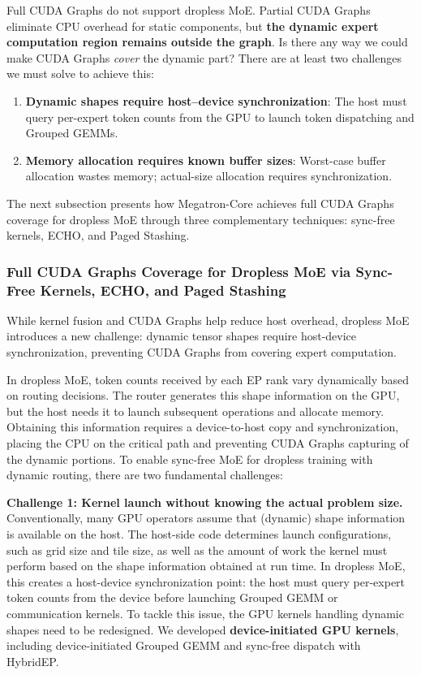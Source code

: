 \documentclass[10pt,logo,copyright]{nvidiatechreport}
\begin{document}
Full CUDA Graphs do not support dropless MoE. Partial CUDA Graphs eliminate CPU overhead for static components, but \textbf{the dynamic expert computation region remains outside the graph}. Is there any way we could make CUDA Graphs \textit{cover} the dynamic part? There are at least two challenges we must solve to achieve this:
\begin{enumerate}
    \item \textbf{Dynamic shapes require host--device synchronization}: The host must query per-expert token counts from the GPU to launch token dispatching and Grouped GEMMs.
    \item \textbf{Memory allocation requires known buffer sizes}: Worst-case buffer allocation wastes memory; actual-size allocation requires synchronization.
\end{enumerate}

The next subsection presents how Megatron-Core achieves full CUDA Graphs coverage for dropless MoE through three complementary techniques: sync-free kernels, ECHO, and Paged Stashing.

\subsubsection{Full CUDA Graphs Coverage for Dropless MoE via Sync-Free Kernels, ECHO, and Paged Stashing}\label{sec:sync-free-moe}

While kernel fusion and CUDA Graphs help reduce host overhead, dropless MoE introduces a new challenge: dynamic tensor shapes require host-device synchronization, preventing CUDA Graphs from covering expert computation.

In dropless MoE, token counts received by each EP rank vary dynamically based on routing decisions. The router generates this shape information on the GPU, but the host needs it to launch subsequent operations and allocate memory. Obtaining this information requires a device-to-host copy and synchronization, placing the CPU on the critical path and preventing CUDA Graphs capturing of the dynamic portions. To enable sync-free MoE for dropless training with dynamic routing, there are two fundamental challenges:

\textbf{Challenge 1: Kernel launch without knowing the actual problem size.}
Conventionally, many GPU operators assume that (dynamic) shape information is available on the host. The host-side code determines launch configurations, such as grid size and tile size, as well as the amount of work the kernel must perform based on the shape information obtained at run time. In dropless MoE, this creates a host-device synchronization point: the host must query per-expert token counts from the device before launching Grouped GEMM or communication kernels. To tackle this issue, the GPU kernels handling dynamic shapes need to be redesigned. We developed \textbf{device-initiated GPU kernels}, including device-initiated Grouped GEMM and sync-free dispatch with HybridEP.
\end{document}
